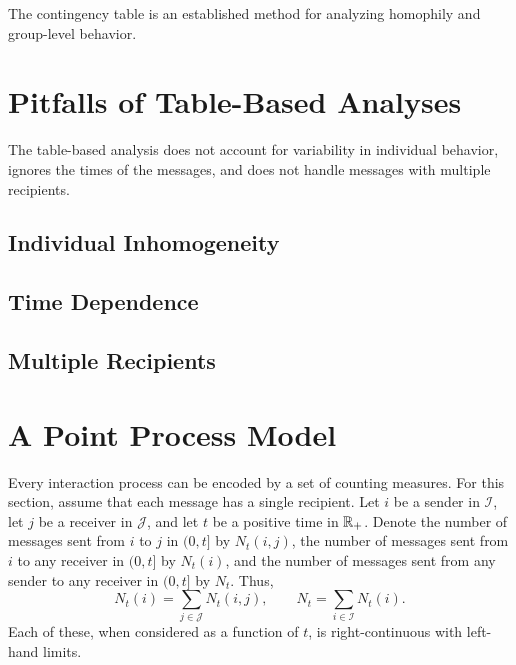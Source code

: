 \documentclass[aoas,preprint]{imsart}
\begin{document}
The contingency table is an established method for analyzing homophily and
group-level behavior.

\section{Pitfalls of Table-Based Analyses}

The table-based analysis does not account for variability in individual
behavior, ignores the times of the messages, and does not handle messages with
multiple recipients.

\subsection{Individual Inhomogeneity}
\subsection{Time Dependence}
\subsection{Multiple Recipients}


\section{A Point Process Model}\label{S:point-process-model}

Every interaction process can be encoded by a set of counting measures.
For this section, assume that each message has a single recipient.
Let $i$ be a sender in $\mathcal{I}$, let $j$ be a receiver in $\mathcal{J}$,
and let $t$ be a positive time in $\mathbb{R}_+$.  Denote the number of
messages sent from $i$ to $j$ in $(0,t]$ by $N_t(i,j)$, the
number of messages sent from $i$ to any receiver in $(0,t]$ by $N_t(i)$, and
the number of messages sent from any sender to any receiver in $(0,t]$ by
$N_t$.  Thus,
\[
    N_t(i) = \sum_{j\in \mathcal{J}} N_t(i,j),
    \qquad
    N_t = \sum_{i\in \mathcal{I}} N_t(i).
\]
Each of these, when considered as a function of $t$, is right-continuous with
left-hand limits.

\end{document}
